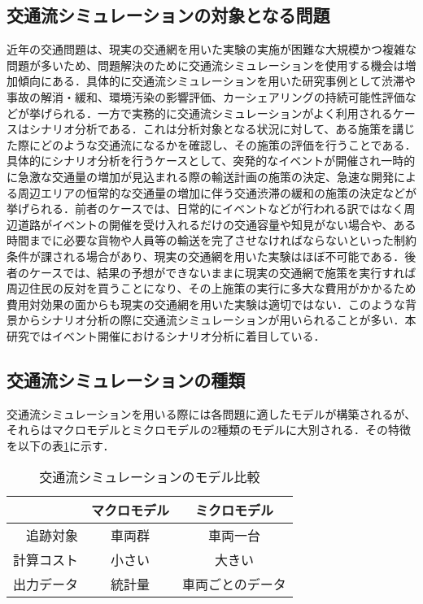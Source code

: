\subsection{交通流シミュレーションの対象となる問題}
近年の交通問題は、現実の交通網を用いた実験の実施が困難な大規模かつ複雑な問題が多いため、問題解決のために交通流シミュレーションを使用する機会は増加傾向にある．具体的に交通流シミュレーションを用いた研究事例として渋滞や事故の解消・緩和\cite{ex_jam,ex_accident}、環境汚染の影響評価\cite{ex_environment}、カーシェアリングの持続可能性評価\cite{ex_car_sharing}などが挙げられる．一方で実務的に交通流シミュレーションがよく利用されるケースはシナリオ分析である．これは分析対象となる状況に対して、ある施策を講じた際にどのような交通流になるかを確認し、その施策の評価を行うことである．具体的にシナリオ分析を行うケースとして、突発的なイベントが開催され一時的に急激な交通量の増加が見込まれる際の輸送計画の施策の決定、急速な開発による周辺エリアの恒常的な交通量の増加に伴う交通渋滞の緩和の施策の決定などが挙げられる．前者のケースでは、日常的にイベントなどが行われる訳ではなく周辺道路がイベントの開催を受け入れるだけの交通容量や知見がない場合や、ある時間までに必要な貨物や人員等の輸送を完了させなければならないといった制約条件が課される場合があり、現実の交通網を用いた実験はほぼ不可能である．後者のケースでは、結果の予想ができないままに現実の交通網で施策を実行すれば周辺住民の反対を買うことになり、その上施策の実行に多大な費用がかかるため費用対効果の面からも現実の交通網を用いた実験は適切ではない．このような背景からシナリオ分析の際に交通流シミュレーションが用いられることが多い．本研究ではイベント開催におけるシナリオ分析に着目している．

\subsection{交通流シミュレーションの種類}
交通流シミュレーションを用いる際には各問題に適したモデルが構築されるが、それらはマクロモデルとミクロモデルの2種類のモデルに大別される．その特徴を以下の表\ref{model_explaination}に示す．

\begin{table}[htb]
  \caption[交通流シミュレーションのモデル比較]{交通流シミュレーションのモデル比較}
  \label{model_explaination}
  \centering
  \begin{tabular}{r|c|c}
     & マクロモデル & ミクロモデル \\ \hline
    追跡対象 & 車両群 & 車両一台 \\
    計算コスト & 小さい & 大きい \\
    出力データ & 統計量 & 車両ごとのデータ
  \end{tabular}
\end{table}

